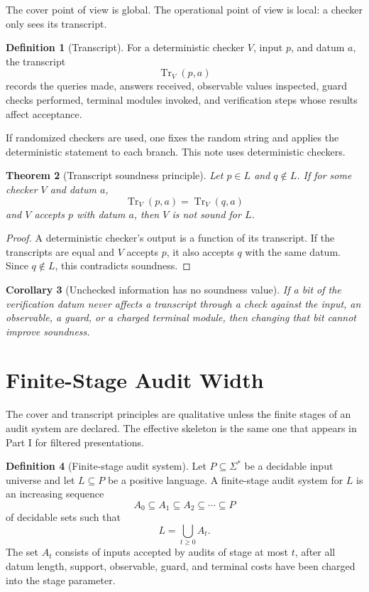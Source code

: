\documentclass[11pt]{article}
\newtheorem{theorem}{Theorem}[section]
\newtheorem{corollary}[theorem]{Corollary}
\theoremstyle{definition}
\newtheorem{definition}[theorem]{Definition}
\DeclareMathOperator{\Tr}{Tr}
\begin{document}
The cover point of view is global. The operational point of view is local: a checker only sees its transcript.

\begin{definition}[Transcript]
For a deterministic checker \(V\), input \(p\), and datum \(a\), the transcript
\[
\Tr_V(p,a)
\]
records the queries made, answers received, observable values inspected, guard checks performed, terminal modules invoked, and verification steps whose results affect acceptance.
\end{definition}

If randomized checkers are used, one fixes the random string and applies the deterministic statement to each branch. This note uses deterministic checkers.

\begin{theorem}[Transcript soundness principle]
Let \(p\in L\) and \(q\notin L\). If for some checker \(V\) and datum \(a\),
\[
\Tr_V(p,a)=\Tr_V(q,a)
\]
and \(V\) accepts \(p\) with datum \(a\), then \(V\) is not sound for \(L\).
\end{theorem}

\begin{proof}
A deterministic checker's output is a function of its transcript. If the transcripts are equal and \(V\) accepts \(p\), it also accepts \(q\) with the same datum. Since \(q\notin L\), this contradicts soundness.
\end{proof}

\begin{corollary}[Unchecked information has no soundness value]
If a bit of the verification datum never affects a transcript through a check against the input, an observable, a guard, or a charged terminal module, then changing that bit cannot improve soundness.
\end{corollary}

\section{Finite-Stage Audit Width}

The cover and transcript principles are qualitative unless the finite stages of an audit system are declared.  The effective skeleton is the same one that appears in Part I for filtered presentations.

\begin{definition}[Finite-stage audit system]
Let \(P\subseteq\Sigma^*\) be a decidable input universe and let \(L\subseteq P\) be a positive language.  A finite-stage audit system for \(L\) is an increasing sequence
\[
A_0\subseteq A_1\subseteq A_2\subseteq\cdots\subseteq P
\]
of decidable sets such that
\[
L=\bigcup_{t\geq0}A_t.
\]
The set \(A_t\) consists of inputs accepted by audits of stage at most \(t\), after all datum length, support, observable, guard, and terminal costs have been charged into the stage parameter.
\end{definition}
\end{document}
